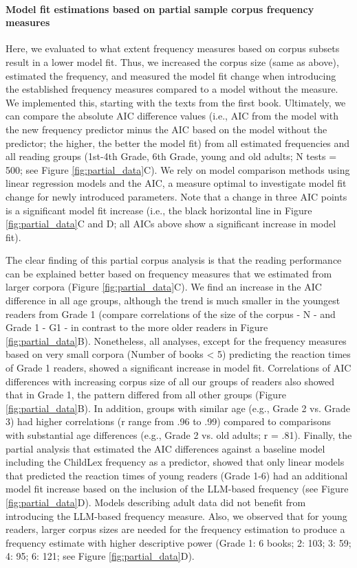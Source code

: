 \documentclass[jou, a4paper]{apa7}
\begin{document}
\paragraph{Model fit estimations based on partial sample corpus frequency measures}

Here, we evaluated to what extent frequency measures based on corpus subsets result in a lower model fit. Thus, we increased the corpus size (same as above), estimated the frequency, and measured the model fit change when introducing the established frequency measures compared to a model without the measure. We implemented this, starting with the texts from the first book. Ultimately, we can compare the absolute AIC difference values (i.e., AIC from the model with the new frequency predictor minus the AIC based on the model without the predictor; the higher, the better the model fit) from all estimated frequencies and all reading groups (1st-4th Grade, 6th Grade, young and old adults; N tests = 500; see Figure \ref{fig:partial_data}C). We rely on model comparison methods using linear regression models and the AIC, a measure optimal to investigate model fit change for newly introduced parameters. Note that a change in three AIC points is a significant model fit increase (i.e., the black horizontal line in Figure \ref{fig:partial_data}C and D; all AICs above show a significant increase in model fit).

The clear finding of this partial corpus analysis is that the reading performance can be explained better based on frequency measures that we estimated from larger corpora (Figure \ref{fig:partial_data}C). We find an increase in the AIC difference in all age groups, although the trend is much smaller in the youngest readers from Grade 1 (compare correlations of the size of the corpus - N - and Grade 1 - G1 - in contrast to the more older readers in Figure \ref{fig:partial_data}B). Nonetheless, all analyses, except for the frequency measures based on very small corpora (Number of books < 5) predicting the reaction times of Grade 1 readers, showed a significant increase in model fit. Correlations of AIC differences with increasing corpus size of all our groups of readers also showed that in Grade 1, the pattern differed from all other groups (Figure \ref{fig:partial_data}B). In addition, groups with similar age (e.g., Grade 2 vs. Grade 3) had higher correlations (r range from .96 to .99) compared to comparisons with substantial age differences (e.g., Grade 2 vs. old adults; r = .81). Finally, the partial analysis that estimated the AIC differences against a baseline model including the ChildLex frequency as a predictor, showed that only linear models that predicted the reaction times of young readers (Grade 1-6) had an additional model fit increase based on the inclusion of the LLM-based frequency (see Figure \ref{fig:partial_data}D). Models describing adult data did not benefit from introducing the LLM-based frequency measure. Also, we observed that for young readers, larger corpus sizes are needed for the frequency estimation to produce a frequency estimate with higher descriptive power (Grade 1: 6 books; 2: 103; 3: 59; 4: 95; 6: 121; see Figure \ref{fig:partial_data}D).
\end{document}
